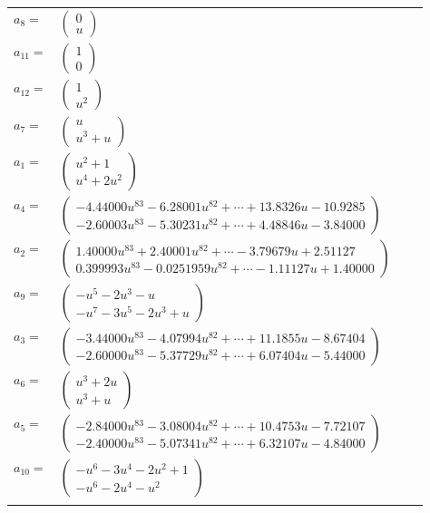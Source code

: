 \documentclass[1p]{elsarticle_modified}
\theoremstyle{definition}
\begin{document}
\begin{tabular}{m{7pt} m{180pt} m{7pt} m{180pt} }
\flushright $a_{8}=$&$\begin{pmatrix}0\\u\end{pmatrix}$ \\
\flushright $a_{11}=$&$\begin{pmatrix}1\\0\end{pmatrix}$ \\
\flushright $a_{12}=$&$\begin{pmatrix}1\\u^2\end{pmatrix}$ \\
\flushright $a_{7}=$&$\begin{pmatrix}u\\u^3+u\end{pmatrix}$ \\
\flushright $a_{1}=$&$\begin{pmatrix}u^2+1\\u^4+2 u^2\end{pmatrix}$ \\
\flushright $a_{4}=$&$\begin{pmatrix}-4.44000 u^{83}-6.28001 u^{82}+\cdots+13.8326 u-10.9285\\-2.60003 u^{83}-5.30231 u^{82}+\cdots+4.48846 u-3.84000\end{pmatrix}$ \\
\flushright $a_{2}=$&$\begin{pmatrix}1.40000 u^{83}+2.40001 u^{82}+\cdots-3.79679 u+2.51127\\0.399993 u^{83}-0.0251959 u^{82}+\cdots-1.11127 u+1.40000\end{pmatrix}$ \\
\flushright $a_{9}=$&$\begin{pmatrix}- u^5-2 u^3- u\\- u^7-3 u^5-2 u^3+u\end{pmatrix}$ \\
\flushright $a_{3}=$&$\begin{pmatrix}-3.44000 u^{83}-4.07994 u^{82}+\cdots+11.1855 u-8.67404\\-2.60000 u^{83}-5.37729 u^{82}+\cdots+6.07404 u-5.44000\end{pmatrix}$ \\
\flushright $a_{6}=$&$\begin{pmatrix}u^3+2 u\\u^3+u\end{pmatrix}$ \\
\flushright $a_{5}=$&$\begin{pmatrix}-2.84000 u^{83}-3.08004 u^{82}+\cdots+10.4753 u-7.72107\\-2.40000 u^{83}-5.07341 u^{82}+\cdots+6.32107 u-4.84000\end{pmatrix}$ \\
\flushright $a_{10}=$&$\begin{pmatrix}- u^6-3 u^4-2 u^2+1\\- u^6-2 u^4- u^2\end{pmatrix}$\\&\end{tabular}
\end{document}
